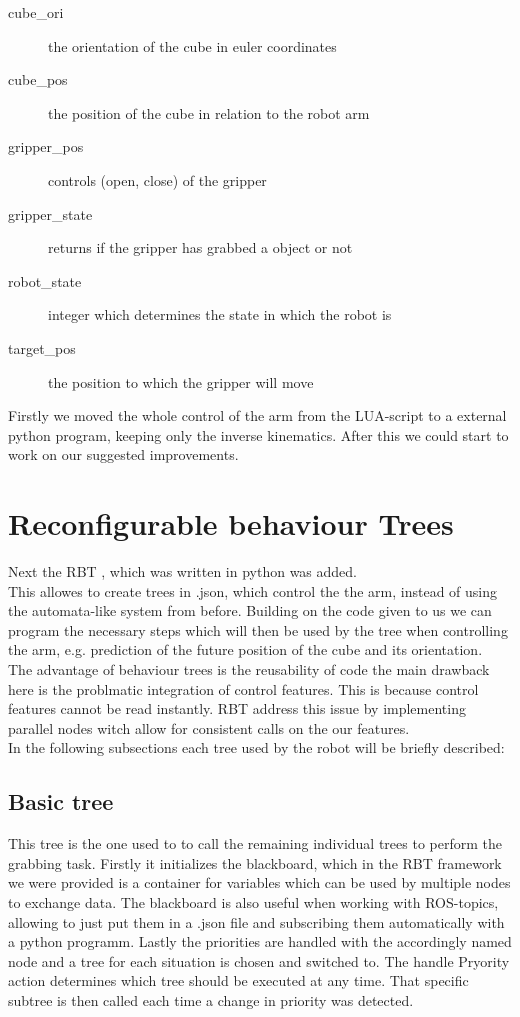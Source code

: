 \documentclass[report]{iisthesis}
\begin{document}
\begin{description}
    \item [cube\_ori] the orientation of the cube in euler coordinates 
    \item [cube\_pos] the position of the cube in relation to the robot arm
    \item [gripper\_pos] controls (open, close) of the gripper
    \item [gripper\_state] returns if the gripper has grabbed a object or not
    \item [robot\_state] integer which determines the state in which the robot is 
    \item [target\_pos] the position to which the gripper will move
\end{description}
\noindent
Firstly we moved the whole control of the arm from the LUA-script to a external python program, keeping only the inverse kinematics.
After this we could start to work on our suggested improvements. 

\section{Reconfigurable behaviour Trees}
Next the RBT \cite{DBLP:journals/corr/abs-2007-10663}, which was written in python was added. \\
This allowes to create trees in .json, which control the the arm, instead of using the automata-like system
from before.
Building on the code given to us we can program the necessary steps which will then be used by the tree when controlling the arm, e.g. prediction of
the future position of the cube and its orientation. \\
The advantage of behaviour trees is the reusability of code the main drawback here is the problmatic integration of control features. \cite{DBLP:journals/corr/abs-2007-10663}
This is because control features cannot be read instantly.
RBT address this issue by implementing parallel nodes witch allow for consistent calls on the our features. \\
In the following subsections each tree used by the robot will be briefly described:

\subsection{Basic tree}
This tree is the one used to to call the remaining individual trees to perform the grabbing task. Firstly it initializes the blackboard, which in the RBT framework we were provided
is a container for variables which can be used by multiple nodes to exchange data. The blackboard is also useful when working with ROS-topics, allowing to just put them in a .json file and subscribing them automatically with a python programm.
Lastly the priorities are handled with the accordingly named node and a tree for each situation is chosen and switched to.
The handle Pryority action determines which tree should be executed at any time. That specific subtree is then called each time a change in priority was detected. 
\end{document}
